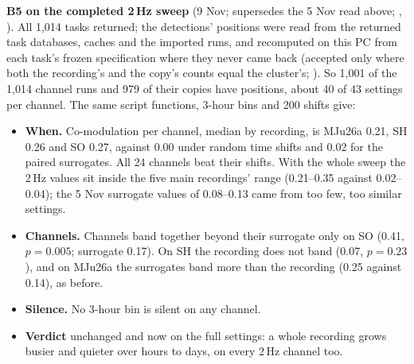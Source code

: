 \begin{instructions}
\textbf{B5 on the completed 2\,Hz sweep} (9 Nov; supersedes the 5 Nov read above;
, ). All
1,014 tasks returned; the detections' positions were read from the returned task databases, caches and the imported
runs, and recomputed on this PC from each task's frozen specification where they never came back (accepted only
where both the recording's and the copy's counts equal the cluster's; ). So 1,001 of the
1,014 channel runs and 979 of their copies have positions, about 40 of 43 settings per channel. The same script
functions, 3-hour bins and 200 shifts give:
\begin{itemize}
  \item \textbf{When.} Co-modulation per channel, median by recording, is MJu26a 0.21, SH 0.26 and SO 0.27,
        against 0.00 under random time shifts and 0.02 for the paired surrogates. All 24 channels beat
        their shifts. With the whole sweep the 2\,Hz values sit inside the five main recordings' range
        (0.21--0.35 against 0.02--0.04); the 5 Nov surrogate values of 0.08--0.13 came from too few, too similar
        settings.
  \item \textbf{Channels.} Channels band together beyond their surrogate only on SO (0.41, $p=0.005$; surrogate
        0.17). On SH the recording does not band (0.07, $p=0.23$), and on MJu26a the surrogates band more than the
        recording (0.25 against 0.14), as before.
  \item \textbf{Silence.} No 3-hour bin is silent on any channel.
  \item \textbf{Verdict} unchanged and now on the full settings: a whole recording grows busier and quieter over hours
        to days, on every 2\,Hz channel too.
\end{itemize}


\end{instructions}
